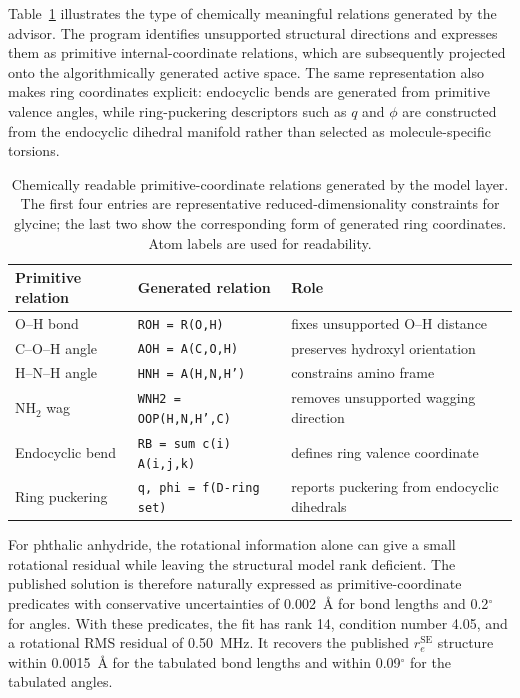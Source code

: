 \documentclass[aip,jcp,reprint,longbibliography,floatfix]{revtex4-2}
\begin{document}
Table~\ref{tab:generated-relation-example} illustrates the type of chemically
meaningful relations generated by the advisor. The program
identifies unsupported structural directions and expresses them as primitive
internal-coordinate relations, which are subsequently projected onto the
algorithmically generated active space. The same representation also makes
ring coordinates explicit: endocyclic bends are generated from primitive
valence angles, while ring-puckering descriptors such as $q$ and $\phi$ are
constructed from the endocyclic dihedral manifold rather than selected as
molecule-specific torsions.

\begin{table}[t]
\caption{Chemically readable primitive-coordinate relations generated by the
model layer. The first four entries are representative reduced-dimensionality
constraints for glycine; the last two show the corresponding form of generated
ring coordinates. Atom labels are used for readability.}
\label{tab:generated-relation-example}
\scriptsize
\setlength{\tabcolsep}{4pt}
\begin{tabular}{@{}lll@{}}
\toprule
Primitive relation & Generated relation & Role \\
\midrule
O--H bond & \texttt{ROH = R(O,H)} & fixes unsupported O--H distance \\
C--O--H angle & \texttt{AOH = A(C,O,H)} & preserves hydroxyl orientation \\
H--N--H angle & \texttt{HNH = A(H,N,H')} & constrains amino frame \\
NH$_2$ wag & \texttt{WNH2 = OOP(H,N,H',C)} & removes unsupported wagging direction \\
Endocyclic bend & \texttt{RB = sum c(i) A(i,j,k)} & defines ring valence coordinate \\
Ring puckering & \texttt{q, phi = f(D-ring set)} & reports puckering from endocyclic dihedrals \\
\bottomrule
\end{tabular}
\end{table}

For phthalic anhydride, the rotational information alone can give a small
rotational residual while leaving the structural model rank deficient. The
published solution is therefore naturally expressed as primitive-coordinate
predicates with conservative uncertainties of 0.002~\AA{} for bond lengths and
0.2$^\circ$ for angles. With these predicates, the fit has
rank 14, condition number 4.05, and a rotational RMS residual of 0.50~MHz. It
recovers the published $r_e^\mathrm{SE}$ structure within 0.0015~\AA{} for the
tabulated bond lengths and within 0.09$^\circ$ for the tabulated angles.
\end{document}
